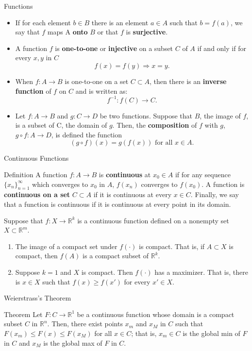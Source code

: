 \documentclass{beamer}
\begin{document}
\begin{frame}{ Functions}
\begin{itemize}
    \item If for each element $b\in B$ there is an element $a\in A$ such that $b=f(a)$, we say that $f$ maps A \textbf{onto } $B$ or that $f$ is \textbf{surjective}. 
    \item A function $f$ is \textbf{one-to-one} or \textbf{injective} on a subset $C$ of $A$ if and only if for every $x, y$ in $C$
    \[f(x)=f(y) \Rightarrow x=y.
    \]
    \item When $f:A\to B $ is one-to-one on a set $C\subset A$, then there is an \textbf{inverse function} of $f$ on $C$ and is written as:
    \[f^{-1}:f(C)\to C.
    \]
    \item Let $f:A \to B$ and $g:C \to D$ be two functions. Suppose that $B$, the image of $f$, is a subset of C, the domain of $g$. Then, the \textbf{composition} of $f$ with $g$, $g\circ f:A \to D$, is defined the function
    \[(g\circ f)(x)=g(f(x)) \text{ for all } x\in A.
    \]
\end{itemize}
\end{frame}

\begin{frame}{Continuous Functions}
\begin{block}{Definition}
A function $f:A\to B$ is \textbf{continuous} at $x_0\in A$ if for any sequence $\{x_n\}_{n=1}^\infty$ which converges to $x_0$ in $A$, $f(x_n)$ converges to $f(x_0)$. A function is \textbf{continuous on a set} $C\subset A$ if it is continuous at every $x\in C$. Finally, we say that a function is continuous if it is continuous at every point in its domain. 
\end{block}
Suppose that $f:X\to \mathbb{R}^k$ is a continuous function defined on a nonempty set $X\subset \mathbb{R}^m$. 
\begin{enumerate}
    \item The image of a compact set under $f(\cdot)$ is compact. That is, if $A\subset X$ is compact, then $f(A)$ is a compact subset of $\mathbb{R}^k$.
    \item Suppose $k=1$ and $X$ is compact. Then $f(\cdot )$ has a maximizer. That is, there is $x\in X$ such that $f(x)\geq f(x')$ for every $x'\in X$.
\end{enumerate}
\end{frame}

\begin{frame}{Weierstrass's Theorem}
\begin{block}{Theorem}
Let $F:C\to \mathbb{R}^1$ be a continuous function whose domain is a compact subset $C$ in $\mathbb{R}^n$. Then, there exist points $x_m$ and $x_M$ in $C$ such that $F(x_m)\leq F(x)\leq F(x_M)$ for all $x\in C$; that is, $x_m\in C$ is the global min of $F$ in $C$ and $x_M$ is the global max of $F$ in $C$.
\end{block}
    
\end{frame}
\end{document}
